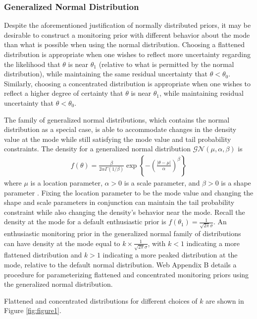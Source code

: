 \documentclass[useAMS,usenatbib,referee]{biom}
\begin{document}
\subsubsection{Generalized Normal Distribution}\label{sec:gen_normal}
Despite the aforementioned justification of normally distributed priors, it may be desirable to construct a monitoring prior with different behavior about the  mode than what is possible when using the normal distribution. 
%
Choosing a flattened distribution is appropriate {when one wishes to reflect more uncertainty regarding the likelihood that 
$\theta$ is near $\theta_1$ (relative to what is permitted by the normal distribution), while maintaining the same residual uncertainty 
that $\theta<\theta_0$}. 
%
Similarly, choosing a concentrated distribution is appropriate {when one wishes to reflect} a higher 
degree of certainty that $\theta$ is near $\theta_1$, while maintaining residual uncertainty that $\theta<\theta_0$. 
%

The family of generalized normal distributions, which contains the normal distribution as a special case, is able to accommodate changes in the density value at the mode while still satisfying the mode value and tail probability constraints. 
%
The density for a generalized normal distribution $\mathcal{GN}(\mu,\alpha,\beta)$ is
\begin{align*}
f(\theta)=\frac{\beta}{2\alpha\Gamma(1/\beta)}\exp\left\{-\left(\frac{|\theta-\mu|}{\alpha}\right)^\beta\right\}
\end{align*} where $\mu$ is a location parameter, $\alpha>0$ is a scale parameter, and $\beta>0$ is a shape parameter \citep{Nadarajah2005}. Fixing the location parameter to be the mode value and changing the shape and scale parameters in conjunction can maintain the tail probability constraint while also changing the density's behavior near the mode. 
%
Recall the density at the mode for a default enthusiastic prior is $f(\theta_1)=\frac{1}{\sqrt{2\pi}\sigma}$. 
%
An enthusiastic monitoring prior in the generalized normal family of distributions can have density at the mode equal to $k\times \frac{1}{\sqrt{2\pi}\sigma}$, with $k<1$ indicating a more flattened distribution and $k>1$ indicating a more peaked distribution at the mode, relative to the default normal distribution. 
%
Web Appendix B details a procedure for parameterizing flattened and concentrated monitoring priors using the generalized normal distribution. 

Flattened and concentrated distributions for different choices of $k$ are shown in Figure \ref{fig:figure1}. 
\end{document}
